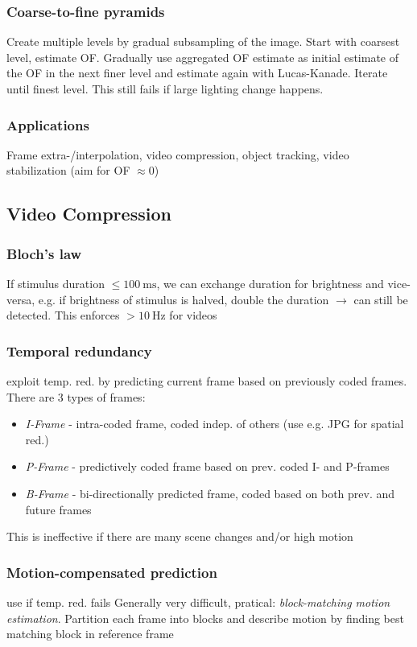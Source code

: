 \documentclass[a4paper,10pt]{article}
\begin{document}
\subsubsection{Coarse-to-fine pyramids} Create multiple levels by gradual subsampling of the image. Start with coarsest level, estimate OF. Gradually use aggregated OF estimate as initial estimate of the OF in the next finer level and estimate again with Lucas-Kanade. Iterate until finest level. This still fails if large lighting change happens.
\subsubsection{Applications} Frame extra-/interpolation, video compression, object tracking, video stabilization (aim for OF \( \approx 0 \))

\subsection{Video Compression}
\subsubsection{Bloch's law} If stimulus duration \( \le \qty{100}{\milli\second}\), we can exchange duration for brightness and vice-versa, e.g. if brightness of stimulus is halved, double the duration \( \rightarrow \) can still be detected. This enforces \( > \qty{10}{\hertz} \) for videos
\subsubsection{Temporal redundancy} exploit temp. red. by predicting current frame based on previously coded frames. There are 3 types of frames:
    \begin{itemize}
	\item \textit{I-Frame} - intra-coded frame, coded indep. of others (use e.g. JPG for spatial red.)
	\item \textit{P-Frame} - predictively coded frame based on prev. coded I- and P-frames
	\item \textit{B-Frame} - bi-directionally predicted frame, coded based on both prev. and future frames
    \end{itemize}
    This is ineffective if there are many scene changes and/or high motion

\subsubsection{Motion-compensated prediction} use if temp. red. fails Generally very difficult, pratical: \textit{block-matching motion estimation}. Partition each frame into blocks and describe motion by finding best matching block in reference frame
\end{document}
